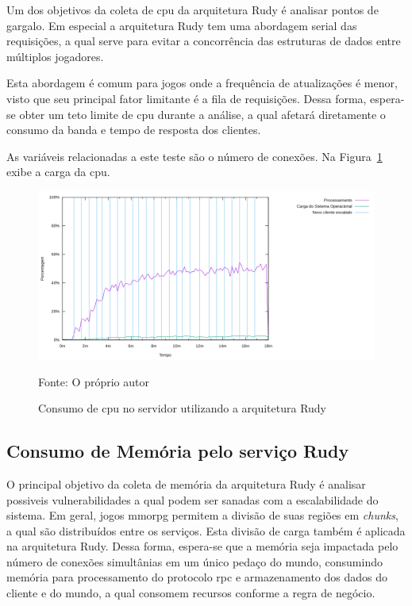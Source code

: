 Um dos objetivos da coleta de \ac{cpu} da arquitetura Rudy é analisar pontos de gargalo.
%
Em especial a arquitetura Rudy tem uma abordagem serial das requisições, a qual serve para evitar a concorrência das estruturas de dados entre múltiplos jogadores.

Esta abordagem é comum para jogos onde a frequência de atualizações é menor, visto que seu principal fator limitante é a fila de requisições.
%
Dessa forma, espera-se obter um teto limite de \ac{cpu} durante a análise, a qual afetará diretamente o consumo da banda e tempo de resposta dos clientes.

As variáveis relacionadas a este teste são o número de conexões.
%
Na Figura~\ref{fig:rudy_t4_cpu} exibe a carga da \ac{cpu}.


\begin{figure}[htb!]
    \caption{Consumo de \ac{cpu} no servidor utilizando a arquitetura Rudy}
    \label{fig:rudy_t4_cpu}
    \includegraphics[width=\textwidth]{metricas_rudy_t4/cpu.png}
    \centering
    
    Fonte: O próprio autor
\end{figure}


\subsection{Consumo de Memória pelo serviço Rudy}

O principal objetivo da coleta de memória da arquitetura Rudy é analisar possiveis vulnerabilidades a qual podem ser sanadas com a escalabilidade do sistema.
%
Em geral, jogos \ac{mmorpg} permitem a divisão de suas regiões em \textit{chunks}, a qual são distribuídos entre os serviços.
%
Esta divisão de carga também é aplicada na arquitetura Rudy.
%
Dessa forma, espera-se que a memória seja impactada pelo número de conexões simultânias em um único pedaço do mundo, consumindo memória para processamento do protocolo \ac{rpc} e armazenamento dos dados do cliente e do mundo, a qual consomem recursos conforme a regra de negócio.

